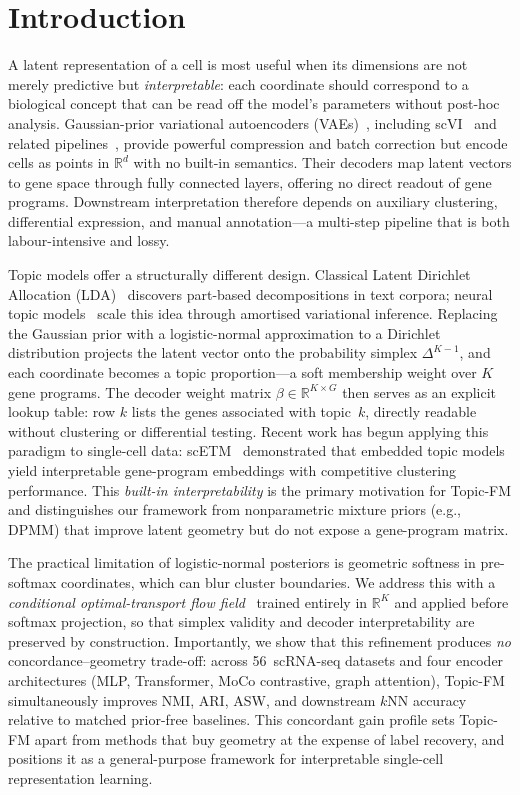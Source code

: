 \documentclass[biology,article,submit,pdftex,moreauthors]{Definitions/mdpi}
\begin{document}
\section{Introduction}\label{sec:intro}

A latent representation of a cell is most useful when its dimensions are not merely predictive but \emph{interpretable}: each coordinate should correspond to a biological concept that can be read off the model's parameters without post-hoc analysis. Gaussian-prior variational autoencoders (VAEs)~\cite{kingma2014auto}, including scVI~\cite{lopez2018deep} and related pipelines~\cite{gayoso2022python,gronbech2020scvae}, provide powerful compression and batch correction but encode cells as points in $\mathbb{R}^d$ with no built-in semantics. Their decoders map latent vectors to gene space through fully connected layers, offering no direct readout of gene programs. Downstream interpretation therefore depends on auxiliary clustering, differential expression, and manual annotation---a multi-step pipeline that is both labour-intensive and lossy.

Topic models offer a structurally different design. Classical Latent Dirichlet Allocation (LDA)~\cite{blei2003latent} discovers part-based decompositions in text corpora; neural topic models~\cite{srivastava2017autoencoding,miao2016neural} scale this idea through amortised variational inference. Replacing the Gaussian prior with a logistic-normal approximation to a Dirichlet distribution projects the latent vector onto the probability simplex $\Delta^{K-1}$, and each coordinate becomes a topic proportion---a soft membership weight over $K$ gene programs. The decoder weight matrix $\beta \in \mathbb{R}^{K \times G}$ then serves as an explicit lookup table: row $k$ lists the genes associated with topic~$k$, directly readable without clustering or differential testing. Recent work has begun applying this paradigm to single-cell data: scETM~\cite{zhao2021scetm} demonstrated that embedded topic models yield interpretable gene-program embeddings with competitive clustering performance. This \emph{built-in interpretability} is the primary motivation for Topic-FM and distinguishes our framework from nonparametric mixture priors (e.g., DPMM) that improve latent geometry but do not expose a gene-program matrix.

The practical limitation of logistic-normal posteriors is geometric softness in pre-softmax coordinates, which can blur cluster boundaries. We address this with a \emph{conditional optimal-transport flow field}~\cite{lipman2023flow,tong2024improving} trained entirely in $\mathbb{R}^K$ and applied before softmax projection, so that simplex validity and decoder interpretability are preserved by construction. Importantly, we show that this refinement produces \emph{no} concordance--geometry trade-off: across 56~scRNA-seq datasets and four encoder architectures (MLP, Transformer, MoCo contrastive, graph attention), Topic-FM simultaneously improves NMI, ARI, ASW, and downstream $k$NN accuracy relative to matched prior-free baselines. This concordant gain profile sets Topic-FM apart from methods that buy geometry at the expense of label recovery, and positions it as a general-purpose framework for interpretable single-cell representation learning.
\end{document}
